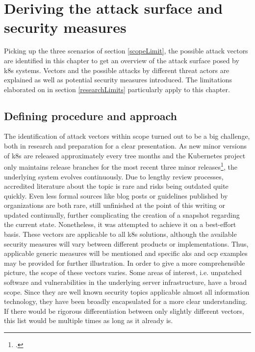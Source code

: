 \chapter{Deriving the attack surface and security measures} \label{deriveRisks}
\setcounter{footnote}{0}

Picking up the three scenarios of section \ref{scopeLimit}, the possible attack vectors are  identified in this chapter to get an overview of the attack surface posed by \gls{k8s} systems. Vectors and the possible attacks by different threat actors are explained as well as potential security measures introduced. The limitations elaborated on in section \ref{researchLimits} particularly apply to this chapter.

\section{Defining procedure and approach}

The identification of attack vectors within scope turned out to be a big challenge, both in research and preparation for a clear presentation. 
As new minor versions of \gls{k8s} are released approximately every tree months and the Kubernetes project only maintains release branches for the most recent three minor releases\footcite[][, section 'Supported versions']{k8sSupport}, the underlying system evolves continuously. Due to lengthy review processes, accredited literature about the topic is rare and risks being outdated quite quickly. Even less formal sources like blog posts or guidelines published by organizations are both rare, still unfinished at the point of this writing or updated continually, further complicating the creation of a snapshot regarding the current state. Nonetheless, it was attempted to achieve it on a best-effort basis.
These vectors are applicable to all \gls{k8s} solutions, although the available security measures will vary between different products or implementations. Thus, applicable  generic measures will be mentioned and specific \gls{aks} and \gls{ocp} examples may be provided for further illustration.
In order to give a more comprehensible picture, the scope of these vectors varies. Some areas of interest, i.e. unpatched software and vulnerabilities in the underlying server  infrastructure, have a broad scope. Since they are well known security topics applicable almost all information technology, they have been broadly encapsulated for a more clear understanding. If there would be rigorous differentiation between only slightly different vectors, this list would be multiple times as long as it already is.

